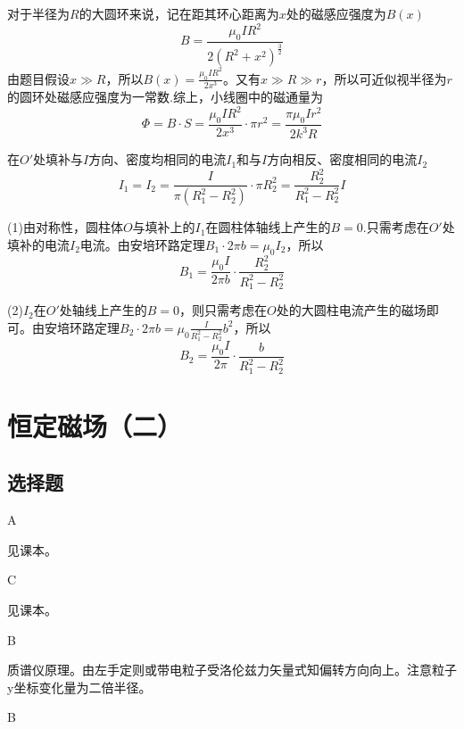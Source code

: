 \documentclass[b5paper,opensource,sourcefont,parskip]{qyxf-book}
\begin{document}

\solve
对于半径为$R$的大圆环来说，记在距其环心距离为$x$处的磁感应强度为$B(x)$
\begin{equation*}
B=\frac{\mu_0IR^2}{2(R^2+x^2)^{\frac{3}{2}}}
\end{equation*}
由题目假设$x\gg R$，所以$B(x)=\frac{\mu_0IR^2}{2x^3}$。又有$x\gg R\gg r$，所以可近似视半径为$r$的圆环处磁感应强度为一常数.综上，小线圈中的磁通量为
\begin{equation*}
\Phi=B\cdot S=\frac{\mu_0IR^2}{2x^3}\cdot \pi r^2=\frac{\pi\mu_0Ir^2}{2k^3R}
\end{equation*}


\solve
在$O'$处填补与$I$方向、密度均相同的电流$I_1$和与$I$方向相反、密度相同的电流$I_2$
\begin{equation*}
I_1=I_2=\frac{I}{\pi (R_1^2-R_2^2)}\cdot\pi R_2^2=\frac{R_2^2}{R_1^2-R_2^2}I
\end{equation*}

(1)由对称性，圆柱体$O$与填补上的$I_1$在圆柱体轴线上产生的$B=0$.只需考虑在$O'$处填补的电流$I_2$电流。由安培环路定理$B_1\cdot2\pi b=\mu_0I_2$，所以
\begin{equation*}
B_1=\frac{\mu_0I}{2\pi b}\cdot\frac{R_2^2}{R_1^2-R_2^2}
\end{equation*}

(2)$I_2$在$O'$处轴线上产生的$B=0$，则只需考虑在$O$处的大圆柱电流产生的磁场即可。由安培环路定理$B_2\cdot2\pi b=\mu_0\frac{I}{R_1^2-R_2^2}b^2$，所以
\begin{equation*}
B_2=\frac{\mu_0I}{2\pi}\cdot\frac{b}{R_1^2-R_2^2}
\end{equation*}

\chapter{恒定磁场（二）}%
\section{选择题}

A

\solve 
见课本。

C

\solve 
见课本。

B

\solve
质谱仪原理。由左手定则或带电粒子受洛伦兹力矢量式知偏转方向向上。注意粒子y坐标变化量为二倍半径。

B
\end{document}
